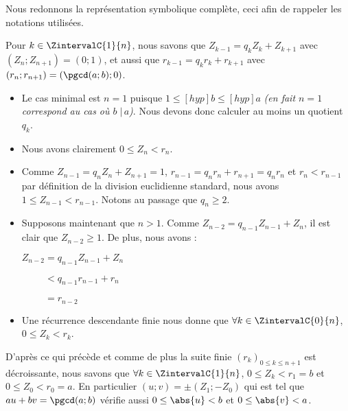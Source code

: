 Nous redonnons la représentation symbolique complète, ceci afin de rappeler les notations utilisées. 



\medskip


Pour $k \in \ZintervalC{1}{n}$, nous savons que $Z_{k-1} = q_k Z_k + Z_{k+1}$ avec $(Z_{n} ; Z_{n+1}) = (0 ; 1)$, et aussi que $r_{k-1} = q_k r_k + r_{k+1}$ avec $(r_{n} ; r_{n+1}) = (\pgcd(a;b) ; 0)$.


\vspace{-.25em}
\begin{itemize}[label = \small\textbullet]
	\item Le cas minimal est $n = 1$ puisque $1 \leq[hyp] b \leq[hyp] a$ \emph{(en fait $n = 1$ correspond au cas où $b \;|\, a$)}.
	Nous devons donc calculer au moins un quotient $q_k$.


	\item Nous avons clairement $0 \leq Z_n < r_n$.


	\item
	Comme $Z_{n-1} = q_n Z_n + Z_{n+1} = 1$, $r_{n-1} = q_n r_n + r_{n+1} = q_n r_n$ et $r_n < r_{n-1}$ par définition de la division euclidienne standard, nous avons $1 \leq Z_{n-1} < r_{n-1}$. Notons au passage que $q_n \geq 2$.
	
	\item Supposons maintenant que $n > 1$. Comme $Z_{n-2} = q_{n-1} Z_{n-1} + Z_{n}$, il est clair que $Z_{n-2} \geq 1$.
	De plus, nous avons :
	
	\smallskip
	
	\noindent
	$Z_{n-2}
	 = q_{n-1} Z_{n-1} + Z_{n}$

	\noindent
	$\phantom{Z_{n-2}}
	 < q_{n-1} r_{n-1} + r_n$

	\noindent
	$\phantom{Z_{n-2}}
	 = r_{n-2}$
	 
	
	\item Une récurrence descendante finie nous donne que $\forall k \in \ZintervalC{0}{n}$, $0 \leq Z_k < r_k$.
\end{itemize}


\medskip


D'après ce qui précède et comme de plus la suite finie $(r_k)_{0 \leq k \leq n+1}$ est décroissante, nous savons que $\forall k \in \ZintervalC{1}{n}$, $0 \leq Z_k < r_1 = b$ et $0 \leq Z_0 < r_0 = a$.
En particulier $(u ; v) = \pm (Z_1 ; -Z_0)$ qui est tel que $au + bv = \pgcd(a;b)$ vérifie aussi $0 \leq \abs{u} < b$ et $0 \leq \abs{v} < a$.


